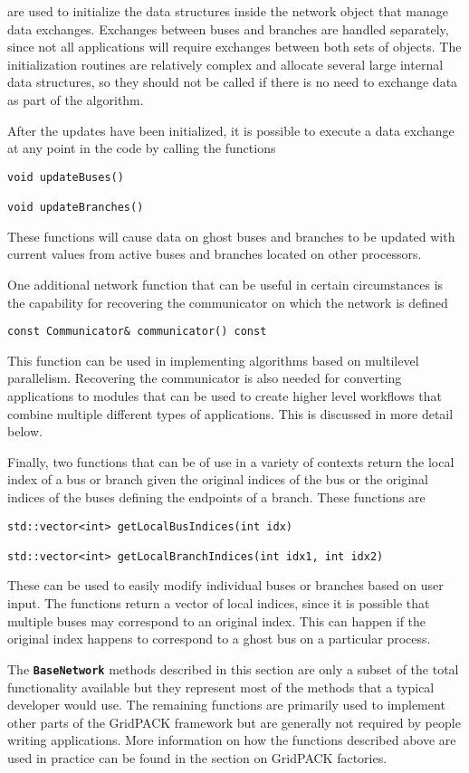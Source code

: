 are used to initialize the data structures inside the network object that manage data exchanges. Exchanges between buses and branches are handled separately, since not all applications will require exchanges between both sets of objects. The initialization routines are relatively complex and allocate several large internal data structures, so they should not be called if there is no need to exchange data as part of the algorithm.

After the updates have been initialized, it is possible to execute a data exchange at any point in the code by calling the functions

{
\color{red}
\begin{Verbatim}[fontseries=b]
void updateBuses()

void updateBranches()
\end{Verbatim}
}

These functions will cause data on ghost buses and branches to be updated with current values from active buses and branches located on other processors.

One additional network function that can be useful in certain circumstances is the capability for recovering the communicator on which the network is defined

{
\color{red}
\begin{Verbatim}[fontseries=b]
const Communicator& communicator() const
\end{Verbatim}
}

This function can be used in implementing algorithms based on multilevel parallelism. Recovering the communicator is also needed for converting applications to modules that can be used to create higher level workflows that combine multiple different types of applications. This is discussed in more detail below.

Finally, two functions that can be of use in a variety of contexts return the
local index of a bus or branch given the original indices of the bus or the
original indices of the buses defining the endpoints of a branch. These
functions are

{
\color{red}
\begin{Verbatim}[fontseries=b]
std::vector<int> getLocalBusIndices(int idx)

std::vector<int> getLocalBranchIndices(int idx1, int idx2)
\end{Verbatim}
}

These can be used to easily modify individual buses or branches based on user
input. The functions return a vector of local indices, since it is possible that
multiple buses may correspond to an original index. This can happen if the
original index happens to correspond to a ghost bus on a particular process.

The \texttt{\textbf{BaseNetwork}} methods described in this section are only a subset of the total functionality available but they represent most of the methods that a typical developer would use. The remaining functions are primarily used to implement other parts of the GridPACK framework but are generally not required by people writing applications. More information on how the functions described above are used in practice can be found in the section on GridPACK factories.
